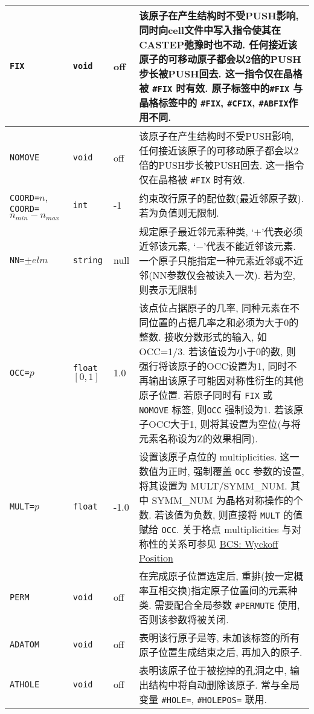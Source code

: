 \documentclass[a4paper, 10pt]{article}
\begin{document}
\begin{center}
\begin{longtable}{m{9em}|m{4em}<{\centering}|m{3em}<{\centering}|m{15em}}
\midrule
\verb|FIX| & \verb|void| & off & 该原子在产生结构时不受PUSH影响, 同时向cell文件中写入指令使其在CASTEP弛豫时也不动. 任何接近该原子的可移动原子都会以2倍的PUSH步长被PUSH回去. 这一指令仅在晶格被 \verb|#FIX| 时有效. 原子标签中的\verb|#FIX| 与晶格标签中的 \verb|#FIX|, \verb|#CFIX|, \verb|#ABFIX|作用不同. \\
\midrule
\verb|NOMOVE| & \verb|void| & off & 该原子在产生结构时不受PUSH影响, 任何接近该原子的可移动原子都会以2倍的PUSH步长被PUSH回去. 这一指令仅在晶格被 \verb|#FIX| 时有效.\\
\midrule
\verb|COORD=|\(n\),\hspace{5em} \verb|COORD=|\(n_{min}-n_{max}\) & \verb|int| & -1 & 约束改行原子的配位数(最近邻原子数). 若为负值则无限制.\\
\midrule
\verb|NN=|\(\pm{}elm\)  & \verb|string| & null & 规定原子最近邻元素种类, `\(+\)'代表必须近邻该元素, `\(-\)'代表不能近邻该元素. 一个原子只能指定一种元素近邻或不近邻(NN参数仅会被读入一次). 若为空, 则表示无限制\\
\midrule
\verb|OCC=|\(p\) & \verb|float| \([0,1]\) & 1.0 & 该点位占据原子的几率, 同种元素在不同位置的占据几率之和必须为大于0的整数. 接收分数形式的输入, 如 OCC=1/3. 若该值设为小于0的数, 则强行将该原子的OCC设置为1, 同时不再输出该原子可能因对称性衍生的其他原子位置. 若原子同时有 \verb|FIX| 或 \verb|NOMOVE| 标签, 则\verb|OCC| 强制设为1. 若该原子OCC大于1, 则将其设置为空位(与将元素名称设为Z的效果相同).\\
\midrule
\verb|MULT=|\(p\) & \verb|float| & -1.0 & 设置该原子点位的 multiplicities. 这一数值为正时, 强制覆盖 \verb|OCC| 参数的设置, 将其设置为 MULT/SYMM\_NUM. 其中 SYMM\_NUM 为晶格对称操作的个数. 若该值为负数, 则直接将 \verb|MULT| 的值赋给 \verb|OCC|. 关于格点 multiplicities 与对称性的关系可参见 \href{https://www.cryst.ehu.es/cryst/get_set.html}{BCS: Wyckoff Position}\\
\midrule
\verb|PERM| & \verb|void| & off & 在完成原子位置选定后, 重排(按一定概率互相交换)指定原子位置间的元素种类. 需要配合全局参数 \verb|#PERMUTE| 使用, 否则该参数将被关闭.\\
\midrule
\verb|ADATOM| & \verb|void| & off & 表明该行原子是等, 未加该标签的所有原子位置生成结束之后, 再加入的原子.\\
\midrule
\verb|ATHOLE| & \verb|void| & off & 表明该原子位于被挖掉的孔洞之中, 输出结构中将自动删除该原子. 常与全局变量 \verb|#HOLE=|, \verb|#HOLEPOS=| 联用.\\
\bottomrule
\end{longtable}
\end{center}
\end{document}
